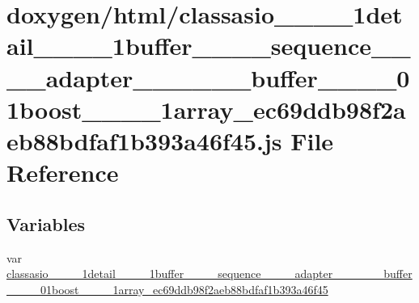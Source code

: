 \hypertarget{classasio____1____1detail____1____1buffer________sequence________adapter____3____01____buffer___d9c20170cf487fbe57729642c3061d68}{}\section{doxygen/html/classasio\+\_\+\+\_\+\_\+\+\_\+1detail\+\_\+\+\_\+\_\+\+\_\+1buffer\+\_\+\+\_\+\+\_\+\+\_\+sequence\+\_\+\+\_\+\+\_\+\+\_\+adapter\+\_\+\+\_\+\_\+\+\_\+\_\+\+\_\+buffer\+\_\+\+\_\+\_\+\+\_\+01boost\+\_\+\+\_\+\_\+\+\_\+1array\+\_\+ec69ddb98f2aeb88bdfaf1b393a46f45.js File Reference}
\label{classasio____1____1detail____1____1buffer________sequence________adapter____3____01____buffer___d9c20170cf487fbe57729642c3061d68}
\subsection*{Variables}
\begin{DoxyCompactItemize}
\item 
var \hyperlink{classasio____1____1detail____1____1buffer________sequence________adapter____3____01____buffer___d9c20170cf487fbe57729642c3061d68_ab5855377f0d86122e956fbc5c5e49fac}{classasio\+\_\+\+\_\+\_\+\+\_\+1detail\+\_\+\+\_\+\_\+\+\_\+1buffer\+\_\+\+\_\+\+\_\+\+\_\+sequence\+\_\+\+\_\+\+\_\+\+\_\+adapter\+\_\+\+\_\+\_\+\+\_\+\_\+\+\_\+buffer\+\_\+\+\_\+\_\+\+\_\+01boost\+\_\+\+\_\+\_\+\+\_\+1array\+\_\+ec69ddb98f2aeb88bdfaf1b393a46f45}
\end{DoxyCompactItemize}


